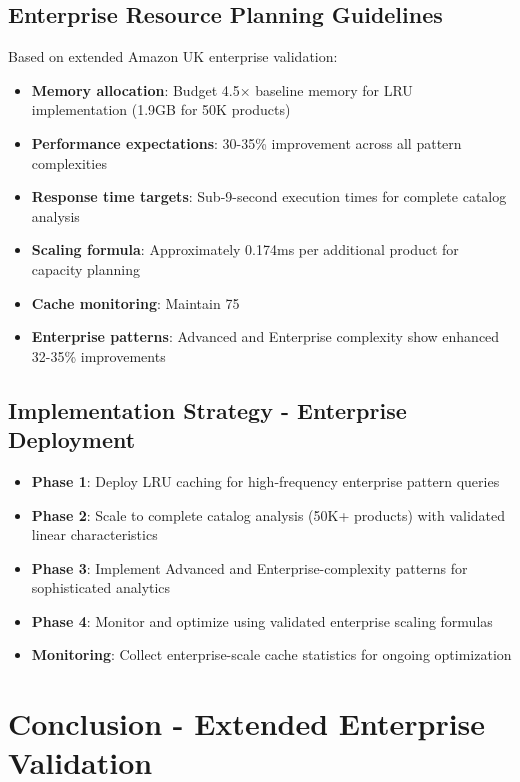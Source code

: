 \documentclass{article}
\begin{document}
\subsection{Enterprise Resource Planning Guidelines}
Based on extended Amazon UK enterprise validation:
\begin{itemize}
    \item \textbf{Memory allocation}: Budget 4.5× baseline memory for LRU implementation (1.9GB for 50K products)
    \item \textbf{Performance expectations}: 30-35\% improvement across all pattern complexities
    \item \textbf{Response time targets}: Sub-9-second execution times for complete catalog analysis
    \item \textbf{Scaling formula}: Approximately 0.174ms per additional product for capacity planning
    \item \textbf{Cache monitoring}: Maintain 75%
    \item \textbf{Enterprise patterns}: Advanced and Enterprise complexity show enhanced 32-35\% improvements
\end{itemize}

\subsection{Implementation Strategy - Enterprise Deployment}
\begin{itemize}
    \item \textbf{Phase 1}: Deploy LRU caching for high-frequency enterprise pattern queries
    \item \textbf{Phase 2}: Scale to complete catalog analysis (50K+ products) with validated linear characteristics
    \item \textbf{Phase 3}: Implement Advanced and Enterprise-complexity patterns for sophisticated analytics
    \item \textbf{Phase 4}: Monitor and optimize using validated enterprise scaling formulas
    \item \textbf{Monitoring}: Collect enterprise-scale cache statistics for ongoing optimization
\end{itemize}

\section{Conclusion - Extended Enterprise Validation}
\end{document}
